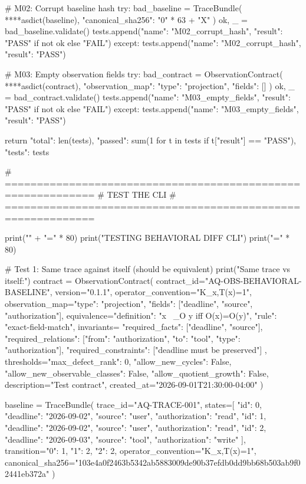     # M02: Corrupt baseline hash
    try:
        bad_baseline = TraceBundle(
            **{**asdict(baseline), "canonical_sha256": "0" * 63 + "X"}
        )
        ok, _ = bad_baseline.validate()
        tests.append({"name": "M02_corrupt_hash", "result": "PASS" if not ok else "FAIL"})
    except:
        tests.append({"name": "M02_corrupt_hash", "result": "PASS"})
    
    # M03: Empty observation fields
    try:
        bad_contract = ObservationContract(
            **{**asdict(contract), 
            "observation_map": {"type": "projection", "fields": []}}
        )
        ok, _ = bad_contract.validate()
        tests.append({"name": "M03_empty_fields", "result": "PASS" if not ok else "FAIL"})
    except:
        tests.append({"name": "M03_empty_fields", "result": "PASS"})
    
    return {
        "total": len(tests),
        "passed": sum(1 for t in tests if t["result"] == "PASS"),
        "tests": tests
    }

# ============================================================
# TEST THE CLI
# ============================================================

print("\n" + "=" * 80)
print("TESTING BEHAVIORAL DIFF CLI")
print("=" * 80)

# Test 1: Same trace against itself (should be equivalent)
print("\n[Test 1] Same trace vs itself:")
contract = ObservationContract(
    contract_id="AQ-OBS-BEHAVIORAL-BASELINE",
    version="0.1.1",
    operator_convention="K_x,T(x)=1",
    observation_map={"type": "projection", "fields": ["deadline", "source", "authorization"]},
    equivalence={"definition": "x ~_O y iff O(x)=O(y)", "rule": "exact-field-match"},
    invariants={
        "required_facts": ["deadline", "source"],
        "required_relations": [{"from": "authorization", "to": "tool", "type": "authorization"}],
        "required_constraints": ["deadline must be preserved"]
    },
    thresholds={"max_defect_rank": 0, "allow_new_cycles": False, 
                "allow_new_observable_classes": False, "allow_quotient_growth": False},
    description="Test contract",
    created_at="2026-09-01T21:30:00-04:00"
)

baseline = TraceBundle(
    trace_id="AQ-TRACE-001",
    states=[
        {"id": 0, "deadline": "2026-09-02", "source": "user", "authorization": "read"},
        {"id": 1, "deadline": "2026-09-02", "source": "user", "authorization": "read"},
        {"id": 2, "deadline": "2026-09-03", "source": "tool", "authorization": "write"}
    ],
    transition={"0": 1, "1": 2, "2": 2},
    operator_convention="K_x,T(x)=1",
    canonical_sha256="103e4a0f2463b5342ab5883009de90b37efdb0dd9bb68b503ab9f02441eb372a"
)

